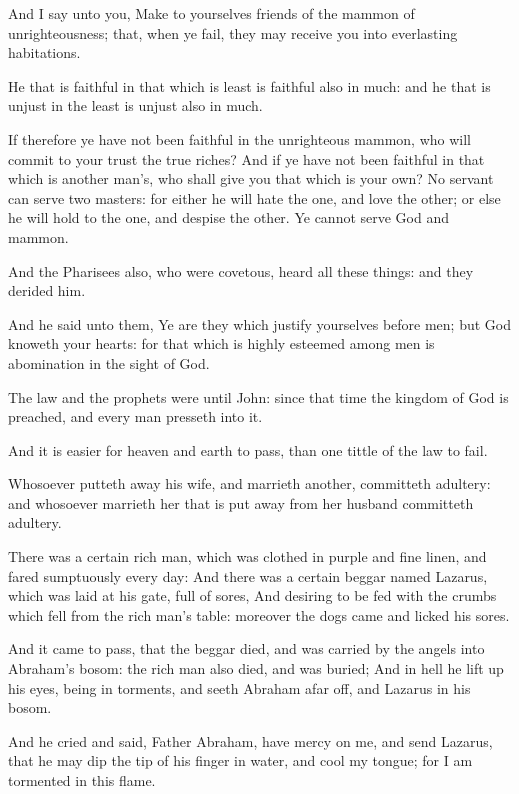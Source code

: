 \Verse And I say unto you, Make to yourselves friends of the mammon of unrighteousness; that, when ye fail, they may receive you into everlasting habitations.

\Verse He that is faithful in that which is least is faithful also in much: and he that is unjust in the least is unjust also in much.

\Verse If therefore ye have not been faithful in the unrighteous mammon, who will commit to your trust the true riches?  \Verse And if ye have not been faithful in that which is another man's, who shall give you that which is your own?  \Verse No servant can serve two masters: for either he will hate the one, and love the other; or else he will hold to the one, and despise the other. Ye cannot serve God and mammon.

\Verse And the Pharisees also, who were covetous, heard all these things: and they derided him.

\Verse And he said unto them, Ye are they which justify yourselves before men; but God knoweth your hearts: for that which is highly esteemed among men is abomination in the sight of God.

\Verse The law and the prophets were until John: since that time the kingdom of God is preached, and every man presseth into it.

\Verse And it is easier for heaven and earth to pass, than one tittle of the law to fail.

\Verse Whosoever putteth away his wife, and marrieth another, committeth adultery: and whosoever marrieth her that is put away from her husband committeth adultery.

\Verse There was a certain rich man, which was clothed in purple and fine linen, and fared sumptuously every day: \Verse And there was a certain beggar named Lazarus, which was laid at his gate, full of sores, \Verse And desiring to be fed with the crumbs which fell from the rich man's table: moreover the dogs came and licked his sores.

\Verse And it came to pass, that the beggar died, and was carried by the angels into Abraham's bosom: the rich man also died, and was buried; \Verse And in hell he lift up his eyes, being in torments, and seeth Abraham afar off, and Lazarus in his bosom.

\Verse And he cried and said, Father Abraham, have mercy on me, and send Lazarus, that he may dip the tip of his finger in water, and cool my tongue; for I am tormented in this flame.


